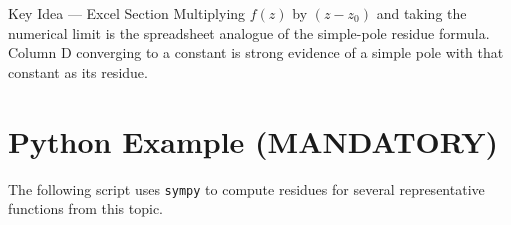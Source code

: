 \documentclass[12pt,a4paper]{article}
\begin{document}
\begin{learnbox}{Key Idea --- Excel Section}
Multiplying $f(z)$ by $(z-z_0)$ and taking the numerical limit is the spreadsheet
analogue of the simple-pole residue formula.  Column D converging to a constant is
strong evidence of a simple pole with that constant as its residue.
\end{learnbox}

\section{Python Example (MANDATORY)}

The following script uses \texttt{sympy} to compute residues for several
representative functions from this topic.
\end{document}
